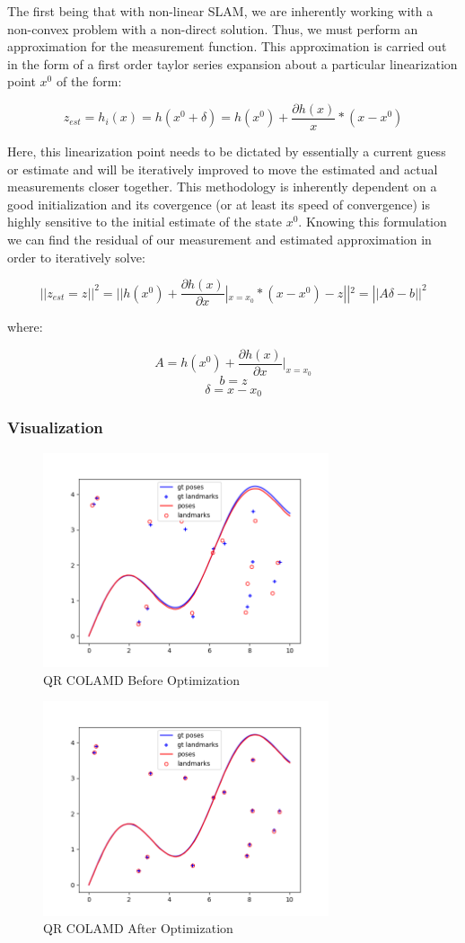 \documentclass[12pt, a4paper]{article}
\begin{document}
The first being that with non-linear SLAM, we are inherently working with a non-convex problem with a non-direct solution. Thus, we must perform an approximation for the measurement function. This approximation is carried out in the form of a first order taylor series expansion about a particular linearization point $x^0$ of the form:

$$z_{est} = h_i(x) = h(x^0 + \delta) = h(x^0) + \frac{\partial h(x)}{x} * (x - x^0)$$ 

Here, this linearization point needs to be dictated by essentially a current guess or estimate and will be iteratively improved to move the estimated and actual measurements closer together. This methodology is inherently dependent on a good initialization and its covergence (or at least its speed of convergence) is highly sensitive to the initial estimate of the state $x^0$. Knowing this formulation we can find the residual of our measurement and estimated approximation in order to iteratively solve: 

$$||z_{est} = z||^2 = ||h(x^0) + \frac{\partial h(x)}{\partial x}|_{x=x_0} * (x - x^0) - z||^2 = ||A\delta - b||^2$$

where:

$$A = h(x^0) + \frac{\partial h(x)}{\partial x}|_{x=x_0}$$
$$b = z$$ 
$$\delta = x-x_0$$

\clearpage
\subsubsection{Visualization}
\begin{figure}[!htb]
    \center
    \includegraphics[width=0.75\textwidth]{nonlinear_results/QRCOLAMD_BeforeOptim.png}
    \caption{QR COLAMD Before Optimization}
\end{figure}

\begin{figure}[!htb]
    \center
    \includegraphics[width=0.75\textwidth]{nonlinear_results/QRCOLAMD_AfterOptim.png}
    \caption{QR COLAMD After Optimization}
\end{figure}
\end{document}
